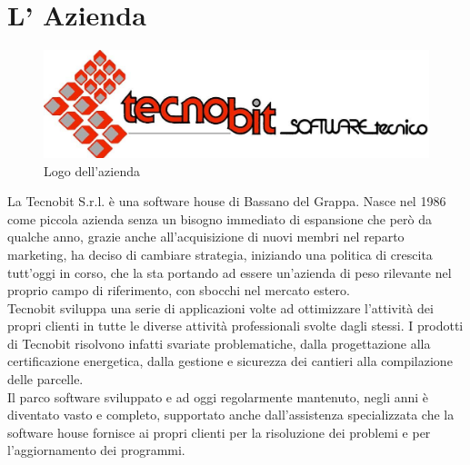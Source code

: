 \section{L' Azienda}

\begin{figure}[!ht]
\centering
 \includegraphics[scale=0.3]{./images/tecnobit.jpg}
\caption{Logo dell'azienda}
\end{figure}

\noindent La Tecnobit S.r.l. \`e una software house di Bassano del Grappa. Nasce nel 1986 come piccola azienda senza un bisogno immediato di espansione che per\`o da qualche anno, grazie anche all'acquisizione di nuovi membri nel reparto marketing, ha deciso di cambiare strategia, iniziando una politica di crescita tutt'oggi in corso, che la sta portando ad essere un'azienda di peso rilevante nel proprio campo di riferimento, con sbocchi nel mercato estero. \\
Tecnobit sviluppa una serie di applicazioni volte ad ottimizzare l’attivit\` a dei propri clienti in tutte le diverse attivit\`a professionali svolte dagli stessi. I prodotti di Tecnobit risolvono infatti svariate problematiche, dalla progettazione alla certificazione energetica, dalla gestione e sicurezza dei cantieri alla compilazione delle parcelle. \\
Il parco software sviluppato e ad oggi regolarmente mantenuto, negli anni \` e diventato vasto e completo, supportato anche dall'assistenza specializzata che la software house fornisce ai propri clienti per la risoluzione dei problemi e per l'aggiornamento dei programmi.


